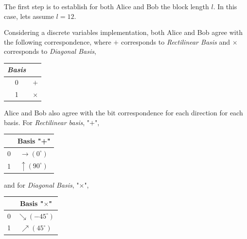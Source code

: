 The first step is to establish for both Alice and Bob the block length $l$. In this case, lets assume $l=12$.

Considering a discrete variables implementation, both Alice and Bob agree with the following correspondence, where $+$ corresponds to \textit{Rectilinear Basis} and $\times$ corresponds to \textit{Diagonal Basis},

\begin{table}[H]
\centering
\begin{tabular}{c|c}
\textbf{\textit{Basis}}         &  \\ \hline
 0 & $+$ \\
 1 & $\times$ \\
\end{tabular}
\end{table}
Alice and Bob also agree with the bit correspondence for each direction for each basis. For \textit{Rectilinear basis}, "$+$",

\begin{table}[H]
\centering
\begin{tabular}{c|c}
            & Basis "+" \\ \hline
 0 & $\to (0^{\circ})$ \\
 1 & $\uparrow (90^{\circ})$ \\
\end{tabular}
\end{table}
and for \textit{Diagonal Basis}, "$\times$",

\begin{table}[H]
\centering
\begin{tabular}{c|c}
      & Basis "$\times$" \\ \hline
 0 & $\searrow (-45^{\circ})$ \\
 1 & $\nearrow (45^{\circ})$ \\
\end{tabular}
\end{table}

